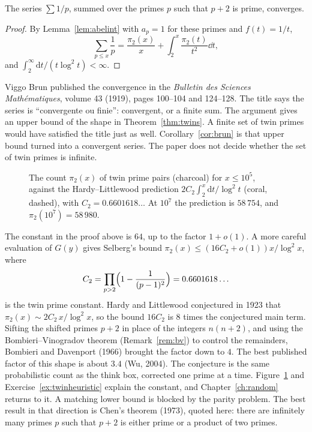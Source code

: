 \begin{corollary}[Brun, 1919]\label{cor:brun}
The series $\sum 1/p$, summed over the primes $p$ such that $p+2$ is prime, converges.
\end{corollary}
\begin{proof}
By Lemma~\ref{lem:abelint} with $a_p=1$ for these primes and $f(t)=1/t$,
\[
\sum_{p\le x}\frac1p=\frac{\pi_2(x)}x+\int_2^x\frac{\pi_2(t)}{t^2}\dd t,
\]
and $\int_2^\infty\mathrm dt/(t\log^2t)<\infty$.
\end{proof}

\begin{remark}[Brun, 1919]
Viggo Brun published the convergence in the \emph{Bulletin des Sciences Math\'ematiques}, volume 43 (1919), pages 100--104 and 124--128. The title says the series is ``convergente ou finie'': convergent, or a finite sum. The argument gives an upper bound of the shape in Theorem~\ref{thm:twins}. A finite set of twin primes would have satisfied the title just as well. Corollary~\ref{cor:brun} is that upper bound turned into a convergent series. The paper does not decide whether the set of twin primes is infinite.
\end{remark}

\begin{figure}[ht]
\centering
{}
\caption{The count $\pi_2(x)$ of twin prime pairs (charcoal) for $x\le10^5$, against the Hardy--Littlewood prediction $2C_2\int_2^x\mathrm dt/\log^2t$ (coral, dashed), with $C_2=0.6601618\ldots$ At $10^7$ the prediction is $58\,754$, and $\pi_2(10^7)=58\,980$.}
\label{fig:twins}
\end{figure}

\begin{remark}
The constant in the proof above is $64$, up to the factor $1+o(1)$. A more careful evaluation of $G(y)$ gives Selberg's bound $\pi_2(x)\le(16C_2+o(1))x/\log^2x$, where
\[
C_2=\prod_{p>2}\Bigl(1-\frac1{(p-1)^2}\Bigr)=0.6601618\ldots
\]
is the twin prime constant. Hardy and Littlewood conjectured in 1923 that $\pi_2(x)\sim2C_2\,x/\log^2x$, so the bound $16C_2$ is $8$ times the conjectured main term. Sifting the shifted primes $p+2$ in place of the integers $n(n+2)$, and using the Bombieri--Vinogradov theorem (Remark~\ref{rem:bv}) to control the remainders, Bombieri and Davenport (1966) brought the factor down to $4$. The best published factor of this shape is about $3.4$ (Wu, 2004). The conjecture is the same probabilistic count as the think box, corrected one prime at a time. Figure~\ref{fig:twins} and Exercise~\ref{ex:twinheuristic} explain the constant, and Chapter~\ref{ch:random} returns to it. A matching lower bound is blocked by the parity problem. The best result in that direction is Chen's theorem (1973), quoted here: there are infinitely many primes $p$ such that $p+2$ is either prime or a product of two primes.
\end{remark}

